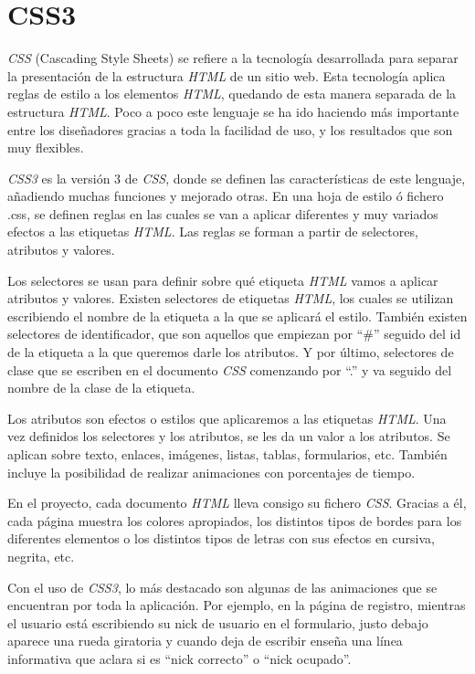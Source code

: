 \documentclass[a4paper, 12pt]{book}
\begin{document}
\section{CSS3}
\label{sec:css3}
\textit{CSS} (Cascading Style Sheets) se refiere a la tecnolog\'ia desarrollada para separar la presentaci\'on de la estructura \textit{HTML} de un sitio web. 
Esta tecnolog\'ia aplica reglas de estilo a los elementos \textit{HTML}, quedando de esta manera separada de la estructura \textit{HTML}. Poco a poco este lenguaje se 
ha ido haciendo m\'as importante entre los dise\~nadores gracias a toda la facilidad de uso, y los resultados que son muy flexibles.

\textit{CSS3} es la versi\'on 3 de \textit{CSS}, donde se definen las caracter\'isticas de este lenguaje, a\~nadiendo muchas funciones y mejorado otras.
En una hoja de estilo \'o fichero .css, se definen reglas en las cuales se van a aplicar diferentes y muy variados efectos a las etiquetas \textit{HTML}.
Las reglas se forman a partir de selectores, atributos y valores. 

Los selectores se usan para definir sobre qu\'e etiqueta \textit{HTML} vamos a aplicar atributos y valores. Existen selectores de etiquetas \textit{HTML}, los cuales 
se utilizan escribiendo el nombre de la etiqueta a la que se aplicar\'a el estilo. Tambi\'en existen selectores de identificador, que son aquellos que 
empiezan por ``\#'' seguido del id de la etiqueta a la que queremos darle los atributos. Y por \'ultimo, selectores de clase que se escriben en el 
documento \textit{CSS} comenzando por ``.'' y va seguido del nombre de la clase de la etiqueta.

Los atributos son efectos o estilos que aplicaremos a las etiquetas \textit{HTML}. Una vez definidos los selectores y los atributos, se les da un valor a 
los atributos. Se aplican sobre texto, enlaces, im\'agenes, listas, tablas, formularios, etc. Tambi\'en incluye la posibilidad de realizar animaciones con 
porcentajes de tiempo.

En el proyecto, cada documento \textit{HTML} lleva consigo su fichero \textit{CSS}. Gracias a \'el, cada p\'agina muestra los colores apropiados, los distintos
tipos de bordes para los diferentes elementos o los distintos tipos de letras con sus efectos en cursiva, negrita, etc.

Con el uso de \textit{CSS3}, lo m\'as destacado son algunas de las animaciones que se encuentran por toda la aplicaci\'on. Por ejemplo, en la p\'agina de 
registro, mientras el usuario est\'a escribiendo su nick de usuario en el formulario, justo debajo aparece una rueda giratoria y cuando deja de escribir 
ense\~na una l\'inea informativa que aclara si es ``nick correcto'' o ``nick ocupado''.
\end{document}
